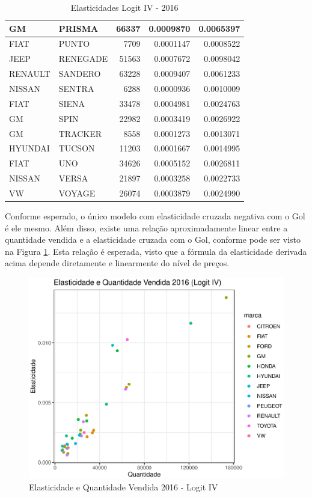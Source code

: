 \documentclass{article}
\begin{document}
\begin{table}[H]
\begin{tabular}{l|l|r|r|r}
\hline
GM & PRISMA & 66337 & 0.0009870 & 0.0065397\\
\hline
FIAT & PUNTO & 7709 & 0.0001147 & 0.0008522\\
\hline
JEEP & RENEGADE & 51563 & 0.0007672 & 0.0098042\\
\hline
RENAULT & SANDERO & 63228 & 0.0009407 & 0.0061233\\
\hline
NISSAN & SENTRA & 6288 & 0.0000936 & 0.0010009\\
\hline
FIAT & SIENA & 33478 & 0.0004981 & 0.0024763\\
\hline
GM & SPIN & 22982 & 0.0003419 & 0.0026922\\
\hline
GM & TRACKER & 8558 & 0.0001273 & 0.0013071\\
\hline
HYUNDAI & TUCSON & 11203 & 0.0001667 & 0.0014995\\
\hline
FIAT & UNO & 34626 & 0.0005152 & 0.0026811\\
\hline
NISSAN & VERSA & 21897 & 0.0003258 & 0.0022733\\
\hline
VW & VOYAGE & 26074 & 0.0003879 & 0.0024990\\
\hline
\end{tabular}
    \caption{Elasticidades Logit IV - 2016}
    \label{tab:elastlogit}
\end{table}

Conforme esperado, o único modelo com elasticidade cruzada negativa com o Gol é ele mesmo. Além disso, existe uma relação aproximadamente linear entre a quantidade vendida e a elasticidade cruzada com o Gol, conforme pode ser visto na Figura \ref{fig:elastlogit}. Esta relação é esperada, visto que a fórmula da elasticidade derivada acima depende diretamente e linearmente do nível de preços.

\begin{figure}[H]
    \centering
    \includegraphics{figs and tabs/elasticidadesiv.eps}
    \caption{Elasticidade e Quantidade Vendida 2016 - Logit IV}
    \label{fig:elastlogit}
\end{figure}
\end{document}
